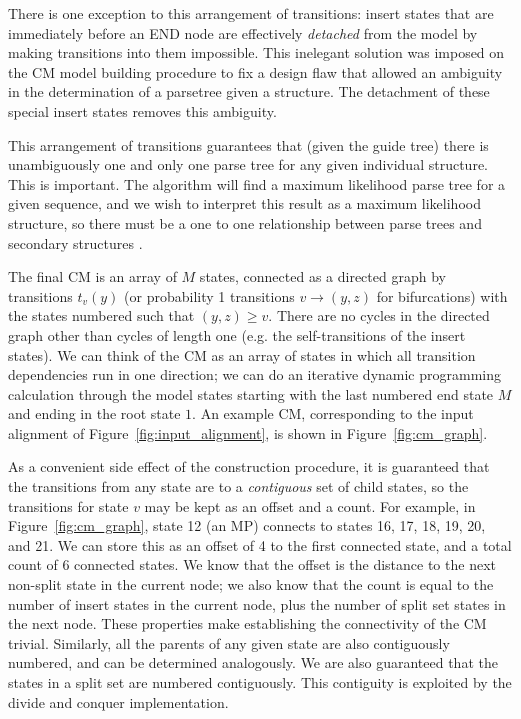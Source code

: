 There is one exception to this arrangement of transitions: insert
states that are immediately before an END node are effectively
\emph{detached} from the model by making transitions into them
impossible. This inelegant solution was imposed on the CM model
building procedure to fix a design flaw that allowed an ambiguity in
the determination of a parsetree given a structure. The detachment of
these special insert states removes this ambiguity.

This arrangement of transitions guarantees that (given the guide tree)
there is unambiguously one and only one parse tree for any given
individual structure. This is important. The algorithm will find a
maximum likelihood parse tree for a given sequence, and we wish to
interpret this result as a maximum likelihood structure, so there must
be a one to one relationship between parse trees and secondary
structures \cite{Giegerich00}.

The final CM is an array of $M$ states, connected as a directed graph
by transitions $t_v(y)$ (or probability 1 transitions $v \rightarrow
(y,z)$ for bifurcations) with the states numbered such that $(y,z)
\geq v$. There are no cycles in the directed graph other than cycles
of length one (e.g. the self-transitions of the insert states). We can
think of the CM as an array of states in which all transition
dependencies run in one direction; we can do an iterative dynamic
programming calculation through the model states starting with the
last numbered end state $M$ and ending in the root state $1$.  An
example CM, corresponding to the input alignment of
Figure~\ref{fig:input_alignment}, is shown in
Figure~\ref{fig:cm_graph}.

As a convenient side effect of the construction procedure, it is
guaranteed that the transitions from any state are to a
\emph{contiguous} set of child states, so the transitions for state
$v$ may be kept as an offset and a count. For example, in
Figure~\ref{fig:cm_graph}, state 12 (an MP) connects to states 16, 17,
18, 19, 20, and 21. We can store this as an offset of 4 to the first
connected state, and a total count of 6 connected states.  We know
that the offset is the distance to the next non-split state in the
current node; we also know that the count is equal to the number of
insert states in the current node, plus the number of split set states
in the next node. These properties make establishing the connectivity
of the CM trivial. Similarly, all the parents of any given state are
also contiguously numbered, and can be determined analogously. We are
also guaranteed that the states in a split set are numbered
contiguously.  This contiguity is exploited by the divide and conquer
implementation.

